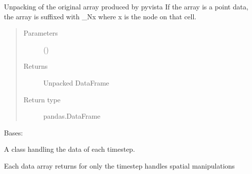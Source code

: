 \documentclass[letterpaper,10pt,english]{sphinxmanual}
\begin{document}
\begin{fulllineitems}
\begin{fulllineitems}
\begin{quote}
\begin{description}
\end{description}\end{quote}

\end{fulllineitems}


\begin{fulllineitems}
\label{\detokenize{openfdem:openfdem.openfdem.Model.unpack_DataFrame}}
Unpacking of the original array produced by pyvista
If the array is a point data, the array is suffixed with \_Nx where x is the node on that cell.
\begin{quote}\begin{description}
\item[{Parameters}] \leavevmode
{} () \textendash{} 

\item[{Returns}] \leavevmode
Unpacked DataFrame

\item[{Return type}] \leavevmode
pandas.DataFrame

\end{description}\end{quote}

\end{fulllineitems}


\end{fulllineitems}


\begin{fulllineitems}
\label{\detokenize{openfdem:openfdem.openfdem.Timestep}}
Bases: 

A class handling the data of each timestep.

Each data array returns for only the timestep
handles spatial manipulations

\end{fulllineitems}
\end{document}
